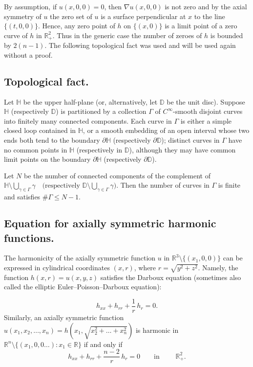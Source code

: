 \documentclass{article}
\newcommand{\R}{\mathbb{R}}
\begin{document}
 
By assumption, if $u(x,0,0)=0$, then $\nabla u(x,0,0)$ is not zero and by the axial symmetry of $u$ the zero set of $u$ is a surface perpendicular at $x$ to the line $\{(t,0,0)\}$.
Hence, any zero point of $h$ on $\{(x,0)\}$ is a limit point of a zero curve of $h$ in $\R^2_+$. Thus in the generic case the number of zeroes of $h$ is bounded by $2(n-1)$. The following topological fact was used and will be used again without a proof.

\subsection{Topological fact.}
Let $\mathbb{H}$ be the upper half-plane (or, alternatively, let $\mathbb{D}$ be the unit disc).
Suppose $\mathbb{H}$ (respectively $\mathbb{D}$) is partitioned by a collection $\Gamma$ of $C^\infty$-smooth disjoint curves into
finitely many connected components.  Each curve in $\Gamma$ is either a simple closed loop contained in $\mathbb{H}$,
    or a smooth embedding of an open interval whose two ends both tend to the boundary
    $\partial\mathbb{H}$ (respectively $\partial \mathbb{D}$);
 distinct curves in $\Gamma$ have no common points in $\mathbb{H}$ (respectively in $\mathbb{D}$),
    although they may have common limit points on the boundary $\partial\mathbb{H}$
    (respectively $\partial \mathbb{D}$).


Let $N$ be the number of connected components of the complement of 
$
\mathbb{H} \setminus \bigcup_{\gamma \in \Gamma} \gamma
\quad
\text{(respectively } 
\mathbb{D} \setminus \bigcup_{\gamma \in \Gamma} \gamma\text{).}
$
Then the number of curves in $\Gamma$ is finite and satisfies
$\#\Gamma \leq N - 1.$




\subsection{Equation for axially symmetric harmonic functions.} 

The harmonicity of the axially symmetric function $u$ in $\mathbb{R}^3\setminus\{(x_1,0,0)\}$ can be expressed in cylindrical coordinates $(x,r)$, where $r=\sqrt{y^2+z^2}$. Namely, the function $h(x,r)=u(x,y,z)$ satisfies the Darboux equation (sometimes also called the elliptic Euler–Poisson–Darboux equation):

\begin{equation}\label{eq:hPDE}
  h_{xx}+h_{rr}+\frac{1}{r}\,h_r=0.
\end{equation}
Similarly, an axially symmetric function $u(x_1,x_2,\dots, x_n)=h(x_1, \sqrt{x_2^2+\dots+ x_n^2})$ is harmonic in $\mathbb{R}^n\setminus\{(x_1,0,0 \dots):x_1\in\mathbb{R}\}$ if and only if 
 \begin{equation}
  h_{xx}+h_{rr}+\frac{n-2}{r}\,h_r=0
  \qquad \text{in }   \qquad \R^2_{+}.
\end{equation}
\end{document}

